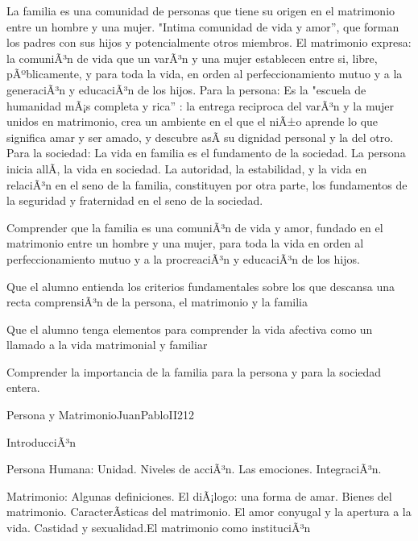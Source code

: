 \begin{syllabus}


\begin{justification}
La familia es una comunidad de personas que tiene su origen en el matrimonio entre un hombre y una mujer. "Intima comunidad de vida y amor'', que forman los padres con sus hijos y potencialmente otros miembros.   El matrimonio expresa: la comuniÃ³n de vida que un varÃ³n y una mujer establecen entre si, libre, pÃºblicamente, y para toda la vida, en orden al perfeccionamiento mutuo y a la generaciÃ³n y educaciÃ³n de los hijos. 
Para la persona: Es la "escuela de humanidad mÃ¡s completa y rica'' : la entrega reciproca del varÃ³n y la mujer unidos en matrimonio, crea  un ambiente en el que el niÃ±o aprende lo que significa amar y ser amado, y descubre asÃ­ su dignidad personal y la del otro. 
Para la sociedad: La vida en familia es el fundamento de la sociedad. La persona inicia allÃ­, la vida en sociedad. La autoridad, la estabilidad, y la vida en relaciÃ³n en el seno de la familia, constituyen por otra parte, los fundamentos de la seguridad y fraternidad en el seno de la sociedad. 
\end{justification}

\begin{goals}
	\item Comprender que la familia es una comuniÃ³n de vida y amor, fundado en el matrimonio entre un hombre y una mujer, para toda la vida en orden al perfeccionamiento mutuo y a la procreaciÃ³n y educaciÃ³n de los hijos.
	\item Que el alumno entienda los criterios fundamentales sobre los que descansa una recta comprensiÃ³n de la persona, el matrimonio y la familia
	\item Que el alumno tenga elementos para comprender la vida afectiva como un llamado a la vida matrimonial y familiar
	\item Comprender la importancia de la familia para la persona y para la sociedad entera.
\end{goals}

\begin{outcomes}
\end{outcomes}

\begin{unit}{Persona y Matrimonio}{JuanPabloII}{21}{2}
\begin{topics}
	\item IntroducciÃ³n 
	\item Persona Humana: Unidad. Niveles de acciÃ³n. Las emociones. IntegraciÃ³n. 
	\item Matrimonio: Algunas definiciones. El diÃ¡logo: una forma de amar. Bienes del matrimonio. CaracterÃ­sticas del matrimonio. El amor conyugal y la apertura a la vida. Castidad  y sexualidad.El matrimonio como instituciÃ³n  
\end{topics}


\end{unit}
\end{syllabus}
